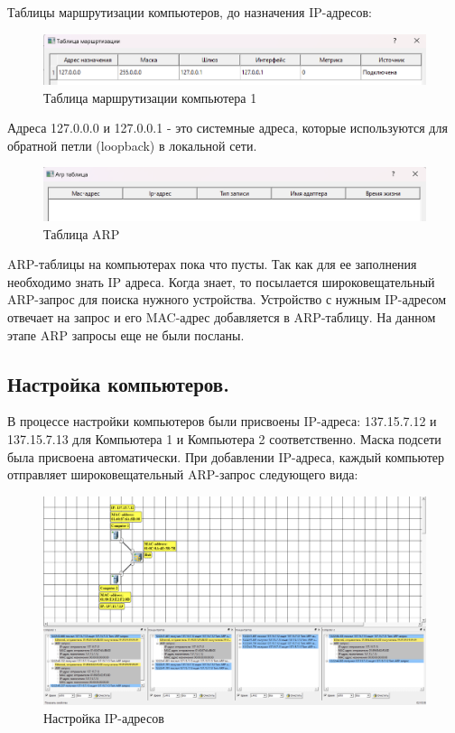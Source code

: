 \documentclass[12pt,onecolumn]{article}
\begin{document}
Таблицы маршрутизации компьютеров, до назначения IP-адресов:
\begin{figure}[H]
    \centering
    \includegraphics[scale=0.5]{image/part1/routing-table-1.png}
    \caption{Таблица маршрутизации компьютера 1}
\end{figure}
Адреса 127.0.0.0 и 127.0.0.1 - это системные адреса, которые используются для обратной петли (loopback) в локальной сети.
\begin{figure}[H]
    \centering
    \includegraphics[scale=0.5]{image/part1/arp-table.png}
    \caption{Таблица ARP}
\end{figure}
ARP-таблицы на компьютерах пока что пусты.
Так как для ее заполнения необходимо знать
IP адреса. Когда знает, то посылается широковещательный ARP-запрос для поиска нужного устройства.
Устройство с нужным IP-адресом отвечает на запрос и его MAC-адрес добавляется в ARP-таблицу.
На данном этапе ARP запросы еще не были посланы.
\subsection{Настройка компьютеров.}
В процессе настройки компьютеров были присвоены IP-адреса: 137.15.7.12 и 137.15.7.13 для Компьютера 1 и Компьютера 2 соответственно.
Маска подсети была присвоена автоматически.
При добавлении IP-адреса, каждый компьютер отправляет широковещательный ARP-запрос следующего вида:
\begin{figure}[H]
    \centering
    \includegraphics[width=\textwidth]{image/part1/arp-request1.png}
    \caption{Настройка IP-адресов}
\end{figure}
\end{document}
